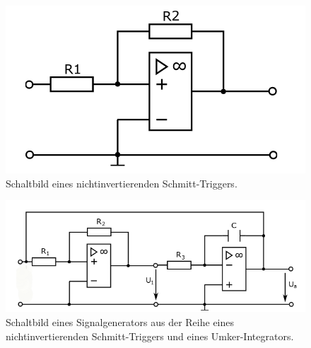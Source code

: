 \begin{figure}
    \centering 
    \includegraphics[width=.5\textwidth]{Bilder/Schmitt.png}
    \caption{Schaltbild eines nichtinvertierenden Schmitt-Triggers.}
    \label{fig:Schmitt}
\end{figure}

\begin{figure}
    \centering 
    \includegraphics[width=.9\textwidth]{Bilder/Signal.png}
    \caption{Schaltbild eines Signalgenerators aus der Reihe eines nichtinvertierenden Schmitt-Triggers und eines Umker-Integrators.}
    \label{fig:Signal}
\end{figure}


